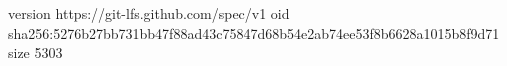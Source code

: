 version https://git-lfs.github.com/spec/v1
oid sha256:5276b27bb731bb47f88ad43c75847d68b54e2ab74ee53f8b6628a1015b8f9d71
size 5303
